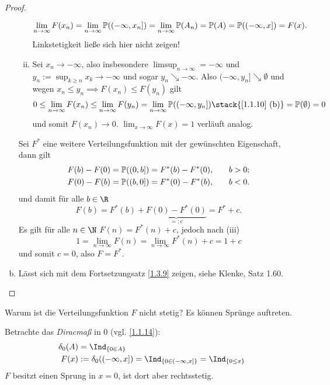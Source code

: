\begin{st}
\begin{proof}
\begin{enumerate}[(a)]
\begin{seg}[Verteilungsfunktion]
\begin{enumerate}[(i)]
							\[
								\lim_{n\to\infty} F(x_n)
								= \lim_{n\to \infty} \P((-\infty,x_n])
								= \lim_{n\to\infty} \P(A_n)
								= \P(A)
								= \P((-\infty, x])
								= F(x).
							\]
							Linkstetigkeit ließe sich hier nicht zeigen!
						\item
							Sei $x_n \to -\infty$, also insbesondere $\limsup_{n\to\infty} = -\infty$ und $y_n := \sup_{k\ge n} x_k \to -\infty$ und sogar $y_n \searrow -\infty$.
							Also $(-\infty, y_n] \searrow \emptyset$ und wegen $x_n \le y_n \implies F(x_n) \le F(y_n)$ gilt
							\[
								0
								\le \lim_{n\to \infty} F(x_n)
								\le \lim_{n\to \infty} F(y_n)
								= \lim_{n\to \infty} \P((-\infty, y_n])
								\stack{\text{\ref{1.1.10} (b)}}= \P(\emptyset)
								= 0
							\]
							und somit $F(x_n) \to 0$.
							$\lim_{x\to\infty} F(x) = 1$ verläuft analog.
					\end{enumerate}
				\end{seg}
				\begin{seg}[Eindeutigkeit]
					Sei $F^*$ eine weitere Verteilungsfunktion mit der gewünschten Eigenschaft, dann gilt
					\begin{align*}
						F(b) - F(0) = \P((0,b]) = F^*(b) - F^*(0), &\qquad b > 0; \\
						F(0) - F(b) = \P((b,0]) = F^*(0) - F^*(b), &\qquad b < 0. \\
					\end{align*}
					und damit für alle $b \in \R$
					\[
						F(b) = F^*(b) + \underbrace{F(0) - F^*(0)}_{=:c}
						= F^* + c.
					\]
					Es gilt für alle $n \in \N$ $F(n) = F^*(n) + c$, jedoch nach (iii)
					\[
						1
						= \lim_{n\to\infty} F(n)
						= \lim_{n\to\infty} F^*(n) + c
						= 1 + c
					\]
					und somit $c = 0$, also $F = F^*$.
				\end{seg}
			\item
				Lässt sich mit dem Fortsetzungsatz \ref{1.3.9} zeigen, siehe Klenke, Satz 1.60. %
		\end{enumerate}
	\end{proof}
\end{st}

Warum ist die Verteilungsfunktion $F$ nicht stetig?
Es können Sprünge auftreten.

\begin{ex} \label{1.4.3}
	Betrachte das \emph{Diracmaß} in $0$ (vgl. \ref{1.1.14}):
	\begin{align*}
		\delta_0(A)
		&= \Ind_{\{0\in A\}} \\
		F(x)
		&:= \delta_0((-\infty,x])
		= \Ind_{\{0\in(-\infty,x]\}}
		= \Ind_{\{0 \le x\}}
	\end{align*}
	$F$ besitzt einen Sprung in $x=0$, ist dort aber rechtsstetig.
\end{ex}


